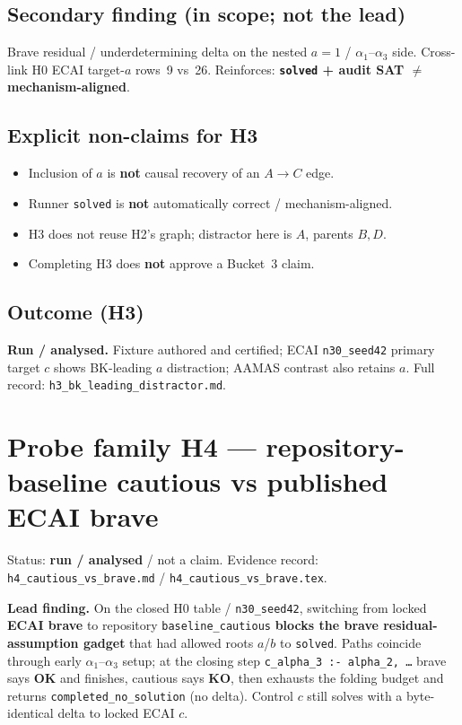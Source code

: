 \documentclass[11pt]{article}
\begin{document}
\subsection{Secondary finding (in scope; not the lead)}

Brave residual / underdetermining delta on the nested \(a{=}1\) /
\(\alpha_1\)--\(\alpha_3\) side.
Cross-link H0 ECAI target-\(a\) rows~9 vs~26.
Reinforces: \textbf{\texttt{solved} + audit SAT \(\neq\) mechanism-aligned}.

\subsection{Explicit non-claims for H3}

\begin{itemize}
  \item Inclusion of \(a\) is \textbf{not} causal recovery of an \(A\to C\) edge.
  \item Runner \texttt{solved} is \textbf{not} automatically correct /
    mechanism-aligned.
  \item H3 does not reuse H2's graph; distractor here is \textbf{\(A\)}, parents
    \textbf{\(B,D\)}.
  \item Completing H3 does \textbf{not} approve a Bucket~3 claim.
\end{itemize}

\subsection{Outcome (H3)}

\textbf{Run / analysed.}
Fixture authored and certified; ECAI \texttt{n30\_seed42} primary target \(c\)
shows BK-leading \(a\) distraction; AAMAS contrast also retains \(a\).
Full record: \texttt{h3\_bk\_leading\_distractor.md}.

\section{Probe family H4 --- repository-baseline cautious vs published ECAI brave}

Status: \textbf{run / analysed} / not a claim.
Evidence record: \texttt{h4\_cautious\_vs\_brave.md} /
\texttt{h4\_cautious\_vs\_brave.tex}.

\textbf{Lead finding.}
On the closed H0 table  /
\texttt{n30\_seed42}, switching from locked \textbf{ECAI brave} to repository
\texttt{baseline\_cautious} \textbf{blocks the brave residual-assumption
gadget} that had allowed roots \(a\)/\(b\) to \texttt{solved}.
Paths coincide through early \(\alpha_1\)--\(\alpha_3\) setup; at the closing
step \texttt{c\_alpha\_3 :- alpha\_2, \ldots} brave says \textbf{OK} and finishes,
cautious says \textbf{KO}, then exhausts the folding budget and returns
\texttt{completed\_no\_solution} (no delta).
Control \(c\) still solves with a byte-identical delta to locked ECAI \(c\).
\end{document}
